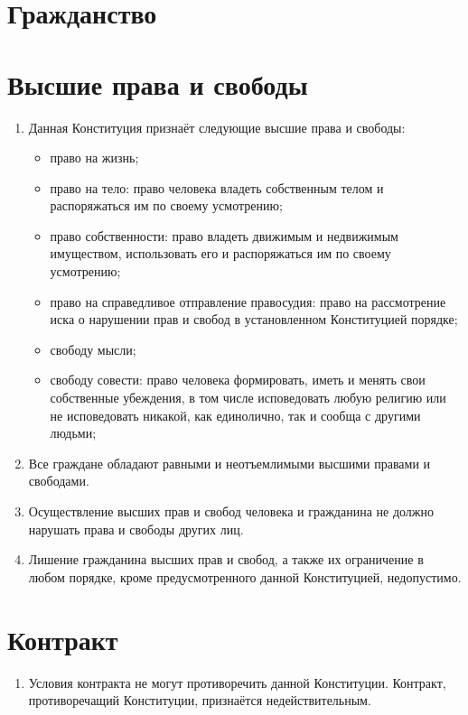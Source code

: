 
\section{Гражданство}

\section{Высшие права и свободы}
\begin{enumerate}
    \item Данная Конституция признаёт следующие высшие права и свободы:
    \begin{itemize}
        \item право на жизнь;
         \item право на тело: право человека владеть собственным телом и распоряжаться им по своему усмотрению;
         \item право собственности: право владеть движимым и недвижимым имуществом, использовать его и распоряжаться им по своему усмотрению;
         \item право на справедливое отправление правосудия: право на рассмотрение иска о нарушении прав и свобод в установленном Конституцией порядке;
         \item свободу мысли;
         \item свободу совести: право человека формировать, иметь и менять свои собственные убеждения, в том числе исповедовать любую религию или не исповедовать никакой, как единолично, так и сообща с другими людьми;
    \end{itemize}
    \item Все граждане обладают равными и неотъемлимыми высшими правами и свободами.
    \item Осуществление высших прав и свобод человека и гражданина не должно нарушать права и свободы других лиц. 
    \item Лишение гражданина высших прав и свобод, а также их ограничение в любом порядке, кроме предусмотренного данной Конституцией, недопустимо. 
    
    
\end{enumerate}
\section{Контракт}
\begin{enumerate}
    
    
    
    
    \item Условия контракта не могут противоречить данной Конституции. Контракт, противоречащий Конституции, признаётся недействительным.
\end{enumerate}
